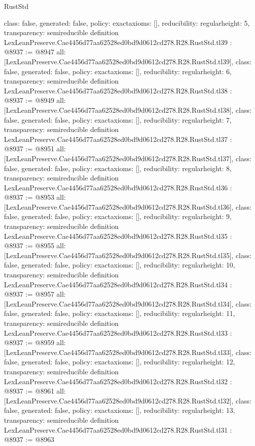 \begin{lexlean}{RustStd}
\begin{coremodule}
{  class: false,
  generated: false,
  policy: exact{axioms: []},
  reducibility: regular{height: 5},
  transparency: semireducible
}
definition LexLeanPreserve.Cae4456d77aa62528ed0bd9d0612cd278.R28.RustStd.tl39 : @8937 := @8947 {
  all: [LexLeanPreserve.Cae4456d77aa62528ed0bd9d0612cd278.R28.RustStd.tl39],
  class: false,
  generated: false,
  policy: exact{axioms: []},
  reducibility: regular{height: 6},
  transparency: semireducible
}
definition LexLeanPreserve.Cae4456d77aa62528ed0bd9d0612cd278.R28.RustStd.tl38 : @8937 := @8949 {
  all: [LexLeanPreserve.Cae4456d77aa62528ed0bd9d0612cd278.R28.RustStd.tl38],
  class: false,
  generated: false,
  policy: exact{axioms: []},
  reducibility: regular{height: 7},
  transparency: semireducible
}
definition LexLeanPreserve.Cae4456d77aa62528ed0bd9d0612cd278.R28.RustStd.tl37 : @8937 := @8951 {
  all: [LexLeanPreserve.Cae4456d77aa62528ed0bd9d0612cd278.R28.RustStd.tl37],
  class: false,
  generated: false,
  policy: exact{axioms: []},
  reducibility: regular{height: 8},
  transparency: semireducible
}
definition LexLeanPreserve.Cae4456d77aa62528ed0bd9d0612cd278.R28.RustStd.tl36 : @8937 := @8953 {
  all: [LexLeanPreserve.Cae4456d77aa62528ed0bd9d0612cd278.R28.RustStd.tl36],
  class: false,
  generated: false,
  policy: exact{axioms: []},
  reducibility: regular{height: 9},
  transparency: semireducible
}
definition LexLeanPreserve.Cae4456d77aa62528ed0bd9d0612cd278.R28.RustStd.tl35 : @8937 := @8955 {
  all: [LexLeanPreserve.Cae4456d77aa62528ed0bd9d0612cd278.R28.RustStd.tl35],
  class: false,
  generated: false,
  policy: exact{axioms: []},
  reducibility: regular{height: 10},
  transparency: semireducible
}
definition LexLeanPreserve.Cae4456d77aa62528ed0bd9d0612cd278.R28.RustStd.tl34 : @8937 := @8957 {
  all: [LexLeanPreserve.Cae4456d77aa62528ed0bd9d0612cd278.R28.RustStd.tl34],
  class: false,
  generated: false,
  policy: exact{axioms: []},
  reducibility: regular{height: 11},
  transparency: semireducible
}
definition LexLeanPreserve.Cae4456d77aa62528ed0bd9d0612cd278.R28.RustStd.tl33 : @8937 := @8959 {
  all: [LexLeanPreserve.Cae4456d77aa62528ed0bd9d0612cd278.R28.RustStd.tl33],
  class: false,
  generated: false,
  policy: exact{axioms: []},
  reducibility: regular{height: 12},
  transparency: semireducible
}
definition LexLeanPreserve.Cae4456d77aa62528ed0bd9d0612cd278.R28.RustStd.tl32 : @8937 := @8961 {
  all: [LexLeanPreserve.Cae4456d77aa62528ed0bd9d0612cd278.R28.RustStd.tl32],
  class: false,
  generated: false,
  policy: exact{axioms: []},
  reducibility: regular{height: 13},
  transparency: semireducible
}
definition LexLeanPreserve.Cae4456d77aa62528ed0bd9d0612cd278.R28.RustStd.tl31 : @8937 := @8963 {
}
\end{coremodule}
\end{lexlean}
